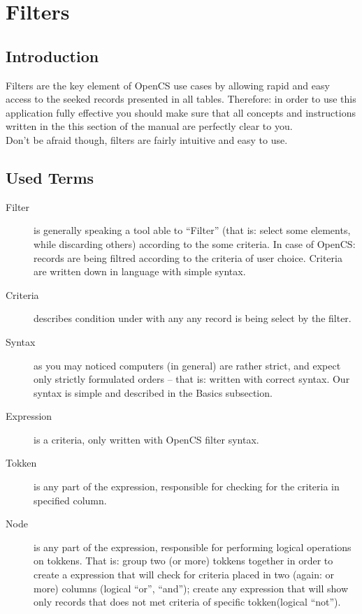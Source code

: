 \section{Filters}
\subsection{Introduction}
Filters are the key element of OpenCS use cases by allowing rapid and easy access to the seeked records presented in all tables. Therefore: in order to use this application fully effective you should make sure that all concepts and instructions written in the this section of the manual are perfectly clear to you.\\
Don't be afraid though, filters are fairly intuitive and easy to use.

\subsection{Used Terms}

\begin{description}
 \item[Filter] is generally speaking a tool able to ``Filter'' (that is: select some elements, while discarding others) according to the some criteria. In case of OpenCS: records are being filtred according to the criteria of user choice. Criteria are written down in language with simple syntax.
 \item[Criteria] describes condition under with any any record is being select by the filter.
 \item[Syntax] as you may noticed computers (in general) are rather strict, and expect only strictly formulated orders -- that is: written with correct syntax. Our syntax is simple and described in the {B}asics subsection.
 \item[Expression] is a criteria, only written with OpenCS filter syntax.
 \item[Tokken] is any part of the expression, responsible for checking for the criteria in specified column.
 \item[Node] is any part of the expression, responsible for performing logical operations on tokkens. That is: group two (or more) tokkens together in order to create a expression that will check for criteria placed in two (again: or more) columns (logical ``or'', ``and''); create any expression that will show only records that does not met criteria of specific tokken(logical ``not'').
\end{description}

